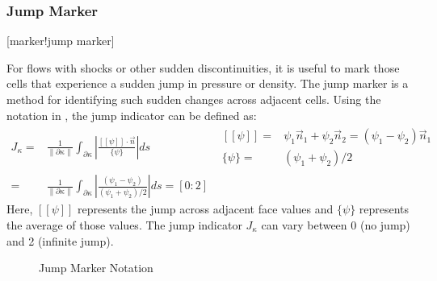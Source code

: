 \subsubsection{Jump Marker}
\label{SEC:JumpMarker}
\key*{}[marker!jump marker]



For flows with shocks or other sudden discontinuities,
it is useful to mark those cells that experience a sudden jump
in pressure or density.
%
The jump marker\cite{Krivodonova_2004, Barter_2007, Barter_2008,
Burgess_2011aiaa, Burgess_2011thesis} is a method for identifying such sudden
changes across adjacent cells.
%
Using the notation in , the jump indicator
can be defined as:
\begin{align}
  \label{EQN:JumpIndicator1}
    J_\kappa
 =& \frac{1}{\|\partial \kappa\|}
    \int_{\partial \kappa}
       \left|
          \frac{ [[ \psi ]] \cdot \vec{n} }
               { \{ \psi \}               }
       \right|
       ds
  & \begin{aligned}
      [[ \psi ]] =& \psi_1 \vec{n}_1 + \psi_2 \vec{n}_2
                 =  \left( \psi_1 - \psi_2 \right) \vec{n}_1 \\
      \{ \psi \} =& \left( \psi_1 + \psi_2 \right) / 2
    \end{aligned}
 \\
  \label{EQN:JumpIndicator2}
 =& \frac{1}{\|\partial \kappa\|}
    \int_{\partial \kappa}
       \left|
         \frac{ \left( \psi_1 - \psi_2 \right) }
              { \left( \psi_1 + \psi_2 \right) / 2 }
       \right|
       ds
 =  \left[ 0 : 2 \right]
\end{align}
%
Here,
$[[\psi]]$ represents the jump across adjacent face values and
$\{\psi\}$ represents the average of those values.
%
The jump indicator $J_\kappa$ can vary between 0 (no jump)
and 2 (infinite jump).

\begin{figure}
  \begin{centering}
    \caption{Jump Marker Notation}
    \label{FIG:Jump_Marker}
  \end{centering}
\end{figure}

